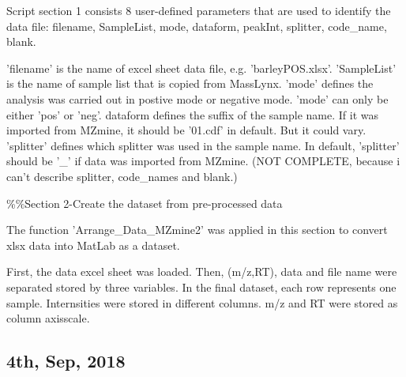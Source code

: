 Script section 1 consists 8 user-defined parameters that are used to identify the data file: filename, SampleList, mode, dataform, peakInt, splitter, code\_name, blank.

'filename' is the name of excel sheet data file, e.g. 'barleyPOS.xlsx'. 'SampleList' is the name of sample list that is copied from MassLynx. 'mode' defines the analysis was carried out in postive mode or negative mode. 'mode' can only be either 'pos' or 'neg'. dataform defines the suffix of the sample name. If it was imported from MZmine, it should be '01.cdf' in default. But it could vary.  'splitter' defines which splitter was used in the sample name. In default, 'splitter' should be '\_' if data was imported from MZmine. (NOT COMPLETE, because i can't describe splitter, code\_names and blank.)

\%\%Section 2-Create the dataset from pre-processed data

The function 'Arrange\_Data\_MZmine2' was applied in this section to convert xlsx data into MatLab as a dataset.

First, the data excel sheet was loaded. Then, (m/z,RT), data and file name were separated stored by three variables. In the final dataset, each row represents one sample. Internsities were stored in different columns. m/z and RT were stored as column axisscale. 

\subsection{4th, Sep, 2018}

